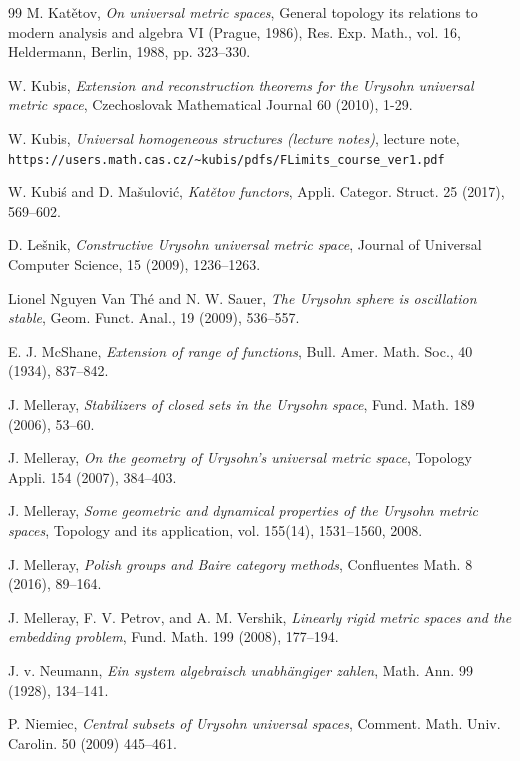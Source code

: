 \documentclass[leqno, 12pt]{jsarticle}
\begin{document}
\begin{thebibliography}{99}
M. Kat\v{e}tov, 
\textit{On universal metric spaces}, 
General topology its relations to modern analysis and algebra VI 
(Prague, 1986), Res. Exp. Math., vol. 16, Heldermann, 
Berlin, 1988, pp. 323--330. 


W. Kubis, 
\textit{Extension and reconstruction theorems for the Urysohn universal metric space}, 
Czechoslovak Mathematical Journal 60 (2010), 
1-29. 

W. Kubis, 
\textit{Universal homogeneous structures (lecture notes)}, 
lecture note, 
\verb|https://users.math.cas.cz/~kubis/pdfs/FLimits_course_ver1.pdf|


W. Kubi\'{s} and D. Ma\v{s}ulovi\'{c}, 
\textit{Kat\v{e}tov functors}, 
Appli. Categor. Struct. 25 (2017), 569--602. 


D. Le\v{s}nik, 
\textit{Constructive Urysohn universal metric space}, 
Journal of Universal Computer Science, 15 (2009), 
1236--1263. 

Lionel Nguyen Van Th\'{e} and N. W. Sauer, 
\textit{The Urysohn sphere is oscillation stable}, 
Geom. Funct. Anal., 
19 (2009), 536--557.  

E. J. McShane, 
\textit{Extension of range of functions}, 
Bull. Amer. Math. Soc., 40 (1934), 837--842. 

J. Melleray, 
\textit{Stabilizers of closed sets in the Urysohn space}, 
Fund. Math. 189 (2006), 53--60. 


J. Melleray, 
\textit{On the geometry of Urysohn's universal metric space}, 
Topology Appli. 154 (2007), 384--403. 


J. Melleray, \textit{Some geometric and dynamical properties of the Urysohn metric spaces}, Topology and its application, vol. 155(14), 1531--1560, 2008. 

J. Melleray, 
\textit{Polish groups and Baire category methods}, 
Confluentes Math. 
8 (2016), 89--164. 


J. Melleray,  F. V. Petrov, 
and A. M. Vershik, 
\textit{Linearly rigid metric spaces and the embedding problem}, 
Fund. Math. 199 (2008), 177--194. 


J. v. Neumann, 
\textit{Ein system algebraisch unabh\"{a}ngiger zahlen}, 
Math. Ann. 99 (1928), 134--141. 


P. Niemiec, 
\textit{Central subsets of Urysohn universal spaces}, 
Comment. Math. Univ. Carolin. 50 (2009) 445--461. 




\end{thebibliography}
\end{document}
